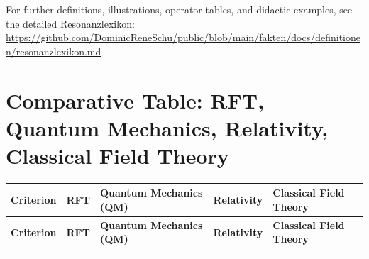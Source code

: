 \documentclass[12pt]{iopart}
\begin{document}
\noindent
For further definitions, illustrations, operator tables, and didactic examples, see the detailed Resonanzlexikon:\\
\url{https://github.com/DominicReneSchu/public/blob/main/fakten/docs/definitionen/resonanzlexikon.md}
\newpage

\section*{Comparative Table: RFT, Quantum Mechanics, Relativity, Classical Field Theory}

\renewcommand{\arraystretch}{1.3}
\begin{center}
	\begin{longtable}{|p{4cm}|p{3cm}|p{3cm}|p{3cm}|p{3cm}|}
		\hline
		\textbf{Criterion} & \textbf{RFT} & \textbf{Quantum Mechanics (QM)} & \textbf{Relativity} & \textbf{Classical Field Theory} \\
		\hline
		\endfirsthead
		
		\hline
		\textbf{Criterion} & \textbf{RFT} & \textbf{Quantum Mechanics (QM)} & \textbf{Relativity} & \textbf{Classical Field Theory} \\
		\hline
		\endhead
		
		\hline
		\endfoot
		
		\hline
		\endlastfoot
		

\end{longtable}
\end{center}
\end{document}
